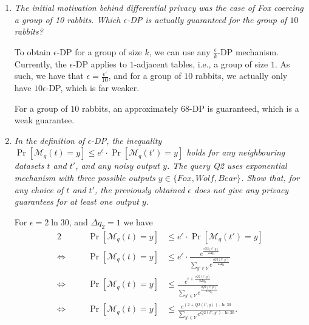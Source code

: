 \documentclass[parskip=half]{scrartcl}
\begin{document}
\begin{enumerate}
    \item \textit{The initial motivation behind differential privacy was the
    case of Fox coercing a group of 10 rabbits. Which $\epsilon$-DP is actually
    guaranteed for the group of $10$ rabbits?}

    To obtain $\epsilon$-DP for a group of size $k$, we can use any
    $\frac{\epsilon}{k}$-DP mechanism. Currently, the $\epsilon$-DP applies to
    $1$-adjacent tables, i.e., a group of size $1$. As such, we have that
    $\epsilon = \frac{\epsilon'}{10}$, and for a group of $10$ rabbits, we
    actually only have $10\epsilon$-DP, which is far weaker.

    For a group of $10$ rabbits, an approximately $68$-DP is guaranteed, which
    is a weak guarantee.

    \item \textit{In the definition of $\epsilon$-DP, the inequality
    $\Pr[\mathcal{M}_q(t) = y] \le e^\epsilon \cdot \Pr[\mathcal{M}_q(t') = y]$
    holds for any neighbouring datasets $t$ and $t'$, and any noisy output $y$.
    The query Q2 uses exponential mechanism with three possible outputs $y \in
    \{Fox, Wolf, Bear\}$. Show that, for any choice of $t$ and $t'$, the
    previously obtained $\epsilon$ does not give any privacy guarantees for at
    least one output $y$.}

    For $\epsilon = 2\ln{30}$, and $\Delta q_2=1$ we have
    \begin{alignat*}{2}
        \quad&&
        \Pr[\mathcal{M}_q(t) = y] &\le
        e^\epsilon \cdot \Pr[\mathcal{M}_q(t') = y]\\
        \Leftrightarrow\quad&&
        \Pr[\mathcal{M}_q(t) = y] &\le
        e^\epsilon \cdot
        \frac{
            e^{\frac{\epsilon Q2(t', y)}{2\Delta q_2}}
        }{
            \sum_{y'\in Y} e^{\frac{\epsilon Q2(t', y')}{2\Delta q_2}}
        }\\
        \Leftrightarrow\quad&&
        \Pr[\mathcal{M}_q(t) = y] &\le
        \frac{
            e^{\epsilon + \frac{\epsilon Q2(t', y)}{2\Delta q_2}}
        }{
            \sum_{y'\in Y} e^{\frac{\epsilon Q2(t', y')}{2\Delta q_2}}
        }\\
        \Leftrightarrow\quad&&
        \Pr[\mathcal{M}_q(t) = y] &\le
        \frac{
            e^{(2 + Q2(t', y)) \cdot \ln{30}}
        }{
            \sum_{y'\in Y} e^{Q2(t', y') \cdot \ln{30}}
        }.
    \end{alignat*}
    

\end{enumerate}
\end{document}
